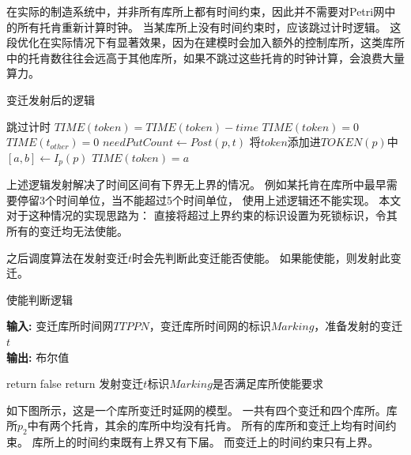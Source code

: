 在实际的制造系统中，并非所有库所上都有时间约束，因此并不需要对Petri网中的所有托肯重新计算时钟。
当某库所上没有时间约束时，应该跳过计时逻辑。
这段优化在实际情况下有显著效果，因为在建模时会加入额外的控制库所，这类库所中的托肯数往往会远高于其他库所，如果不跳过这些托肯的时钟计算，会浪费大量算力。
\begin{algorithm}[H]
	\caption{变迁发射后的逻辑}
	\label{alg3-4}
	\begin{algorithmic}
		\State 跳过计时
		\EndIf
		\State $TIME(token)=TIME(token)-time$
		\State $TIME(token)=0$
		\EndIf
		\EndFor
		\EndFor
		\State $TIME(t_{other})=0$
		\EndFor
		\EndFor
		\State $needPutCount \leftarrow Post(p,t)$
		\State 将$token$添加进$TOKEN(p)$中
		\State $[a,b] \leftarrow I_{p}(p)$
		\State $TIME(token)=a$
		\EndFor
		\EndFor
		\EndProcedure
	\end{algorithmic}
\end{algorithm}

上述逻辑发射解决了时间区间有下界无上界的情况。
例如某托肯在库所中最早需要停留3个时间单位，当不能超过5个时间单位，
使用上述逻辑还不能实现。
本文对于这种情况的实现思路为：
直接将超过上界约束的标识设置为死锁标识，令其所有的变迁均无法使能。

之后调度算法在发射变迁$t$时会先判断此变迁能否使能。
如果能使能，则发射此变迁。

\begin{algorithm}[H]
    \caption{使能判断逻辑}
    \label{}
    \hspace*{0.02in} {\bf 输入:} 
    变迁库所时间网$TTPPN$，变迁库所时间网的标识$Marking$，准备发射的变迁$t$\\
    \hspace*{0.02in} {\bf 输出:}
	布尔值
    \begin{algorithmic}[1]
		\If{此标识$Markintg$超过时间约束}
		\State return false
		\EndIf
		\State return 发射变迁$t$标识$Marking$是否满足库所使能要求
    \end{algorithmic}
\end{algorithm}

如下图所示，这是一个库所变迁时延网的模型。
一共有四个变迁和四个库所。库所$p_{2}$中有两个托肯，其余的库所中均没有托肯。
所有的库所和变迁上均有时间约束。
库所上的时间约束既有上界又有下届。
而变迁上的时间约束只有上界。


